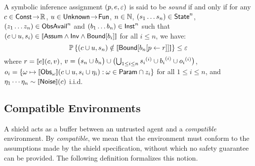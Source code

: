 \documentclass[acmsmall,screen,nonacm]{acmart}
\begin{document}
\begin{definition}\label{def:sound-inf-assignment}
  A symbolic inference assignment $(p, e, \varepsilon)$ is said to be \emph{sound} if and only if for any $c \in \mathsf{Const} \mathrel{\!\to\!} \mathbb{R}$, $u \in \mathsf{Unknown} \mathrel{\!\to\!} \mathsf{Fun}$, $n \in \mathbb{N}$, $(s_1 \dots s_{n}) \in \mathsf{State}^{n}$, $(z_1 \dots z_{n}) \in \mathsf{ObsAvail}^{n}$ and $(b_1 \dots b_{n}) \in \mathsf{Inst}^{n}$ such that $(c \CatValuation u, s_i) \in \sem{\Assum \land \Inv \land \BoundConj{b_i}}$ for all $i \le n$, we have:
  \[\Prob\left\{ (c \CatValuation u, s_{n}) \notin \sem{\BoundConj{\UpdateMap{b_n}{p}{r}}} \right\} \le \Eps \]
   where
    $r = \sem{e}(c, v)$,
    $v = \bigl(s_n \cup b_n \bigr) \cup \bigl(\bigcup_{1 \le i \le n} {s_i}^{(i)} \cup {b_i}^{(i)} \cup {o_i}^{(i)}\bigr)$,
    $o_i = \{\omega \mapsto \sem{\Obs_\omega}(c \CatValuation u, s_i \CatValuation \eta_i) : \omega \in \Param \cap z_i \}$ for all $1 \le i \le n$,
    and $\eta_1 \cdots \eta_{n} \sim \sem{\Noise}(c)$ i.i.d.
\end{definition}



\subsection{Compatible Environments}

A shield acts as a buffer between an untrusted agent and a \emph{compatible} environment. By \emph{compatible}, we mean that the environment must conform to the assumptions made by the shield specification, without which no safety guarantee can be provided. The following definition formalizes this notion. %
\end{document}
